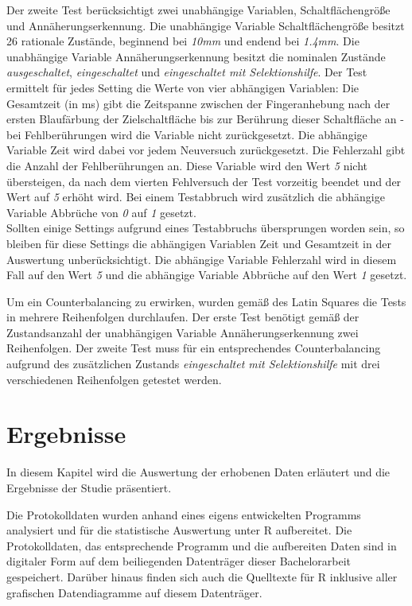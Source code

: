 \documentclass[12pt,bibliography=totocnumbered,listof=totocnumbered,abstracton]{scrreprt}
\begin{document}
Der zweite Test berücksichtigt zwei unabhängige Variablen, {\ttfamily Schaltflächengröße} und {\ttfamily Annäherungserkennung}. Die unabhängige Variable {\ttfamily Schaltflächengröße} besitzt 26 rationale Zustände, beginnend bei \emph{10mm} und endend bei \emph{1.4mm}. Die unabhängige Variable {\ttfamily Annäherungserkennung} besitzt die nominalen Zustände \emph{ausgeschaltet}, \emph{eingeschaltet} und \emph{eingeschaltet mit Selektionshilfe}. Der Test ermittelt für jedes Setting die Werte von vier abhängigen Variablen: Die {\ttfamily Gesamtzeit} (in ms) gibt die Zeitspanne zwischen der Fingeranhebung nach der ersten Blaufärbung der Zielschaltfläche bis zur Berührung dieser Schaltfläche an - bei Fehlberührungen wird die Variable nicht zurückgesetzt. Die abhängige Variable {\ttfamily Zeit} wird dabei vor jedem Neuversuch zurückgesetzt. Die {\ttfamily Fehlerzahl} gibt die Anzahl der Fehlberührungen an. Diese Variable wird den Wert \emph{5} nicht übersteigen, da nach dem vierten Fehlversuch der Test vorzeitig beendet und der Wert auf \emph{5} erhöht wird. Bei einem Testabbruch wird zusätzlich die abhängige Variable {\ttfamily Abbrüche} von \emph{0} auf \emph{1} gesetzt.\\
Sollten einige Settings aufgrund eines Testabbruchs übersprungen worden sein, so bleiben für diese Settings die abhängigen Variablen {\ttfamily Zeit} und {\ttfamily Gesamtzeit} in der Auswertung unberücksichtigt. Die abhängige Variable {\ttfamily Fehlerzahl} wird in diesem Fall auf den Wert \emph{5} und die abhängige Variable {\ttfamily Abbrüche} auf den Wert \emph{1} gesetzt.

Um ein Counterbalancing zu erwirken, wurden gemäß des Latin Squares die Tests in mehrere Reihenfolgen durchlaufen. Der erste Test benötigt gemäß der Zustandsanzahl der unabhängigen Variable {\ttfamily Annäherungserkennung} zwei Reihenfolgen. Der zweite Test muss für ein entsprechendes Counterbalancing aufgrund des zusätzlichen Zustands \emph{eingeschaltet mit Selektionshilfe} mit drei verschiedenen Reihenfolgen getestet werden.

\chapter{Ergebnisse}
In diesem Kapitel wird die Auswertung der erhobenen Daten erläutert und die Ergebnisse der Studie präsentiert.

Die Protokolldaten wurden anhand eines eigens entwickelten Programms analysiert und für die statistische Auswertung unter R aufbereitet. Die Protokolldaten, das entsprechende Programm und die aufbereiten Daten sind in digitaler Form auf dem beiliegenden Datenträger dieser Bachelorarbeit gespeichert. Darüber hinaus finden sich auch die Quelltexte für R inklusive aller grafischen Datendiagramme auf diesem Datenträger.
\end{document}

